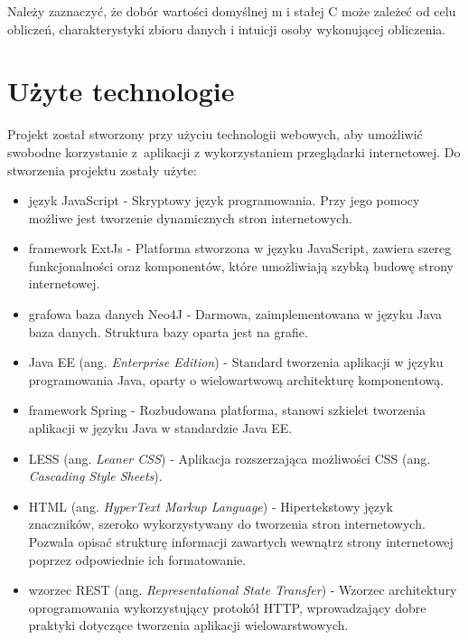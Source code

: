 Należy zaznaczyć, że dobór wartości domyślnej m i stałej C może zależeć od celu obliczeń, charakterystyki zbioru danych i intuicji osoby wykonującej obliczenia.

\section{Użyte technologie}
Projekt został stworzony przy użyciu technologii webowych, aby umożliwić swobodne korzystanie z~aplikacji z wykorzystaniem przeglądarki internetowej. Do stworzenia projektu zostały użyte:
\begin{itemize}
\item język JavaScript - Skryptowy język programowania. Przy jego pomocy możliwe jest tworzenie dynamicznych stron internetowych.\cite{js}
\item framework ExtJs - Platforma stworzona w języku JavaScript, zawiera szereg funkcjonalności oraz komponentów, które umożliwiają szybką budowę strony internetowej.\cite{extjs}
\item grafowa baza danych Neo4J - Darmowa, zaimplementowana w języku Java baza danych. Struktura bazy oparta jest na grafie.
\item Java EE (ang. \textit{Enterprise Edition}) - Standard tworzenia aplikacji w języku programowania Java, oparty o wielowartwową architekturę komponentową.\cite{javaee}
\item framework Spring - Rozbudowana platforma, stanowi szkielet tworzenia aplikacji w języku Java w standardzie Java EE.\cite{springAction}
\item LESS (ang. \textit{Leaner CSS}) - Aplikacja rozszerzająca możliwości CSS (ang. \textit{Cascading Style Sheets}).\cite{LESS}
\item HTML (ang. \textit{HyperText Markup Language}) - Hipertekstowy język znaczników, szeroko wykorzystywany do tworzenia stron internetowych. Pozwala opisać strukturę informacji zawartych wewnątrz strony internetowej poprzez odpowiednie ich formatowanie.\cite{html}
\item wzorzec REST (ang. \textit{Representational State Transfer}) - Wzorzec architektury oprogramowania wykorzystujący protokół HTTP, wprowadzający dobre praktyki dotyczące tworzenia aplikacji wielowarstwowych.\cite{restWww}
\end{itemize}

